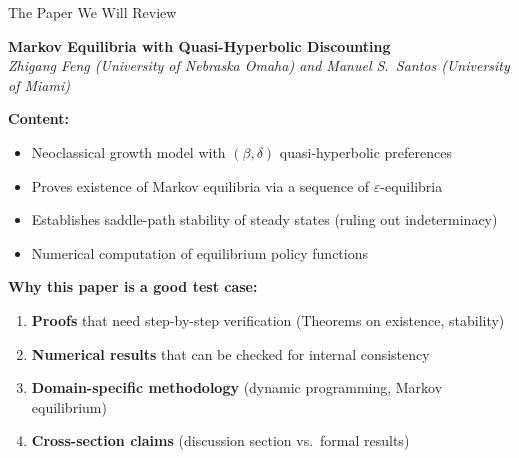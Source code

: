 \documentclass[10pt,english,aspectratio=169]{beamer}
\begin{document}
\begin{frame}{The Paper We Will Review}

\begin{tcolorbox}[colback=blue!3, colframe=RedTitle!60, title={\footnotesize Demo Paper}, fonttitle=\bfseries\footnotesize]
\textbf{Markov Equilibria with Quasi-Hyperbolic Discounting}\\
\textit{Zhigang Feng (University of Nebraska Omaha) and Manuel S.\ Santos (University of Miami)}
\end{tcolorbox}

\vspace{0.2cm}
\textbf{Content:}
\begin{itemize}
    \item Neoclassical growth model with $(\beta, \delta)$ quasi-hyperbolic preferences
    \item Proves existence of Markov equilibria via a sequence of $\varepsilon$-equilibria
    \item Establishes saddle-path stability of steady states (ruling out indeterminacy)
    \item Numerical computation of equilibrium policy functions
\end{itemize}

\vspace{0.2cm}
\textbf{Why this paper is a good test case:}
\begin{enumerate}
    \item \textbf{Proofs} that need step-by-step verification (Theorems on existence, stability)
    \item \textbf{Numerical results} that can be checked for internal consistency
    \item \textbf{Domain-specific methodology} (dynamic programming, Markov equilibrium)
    \item \textbf{Cross-section claims} (discussion section vs.\ formal results)
\end{enumerate}

\end{frame}
\end{document}
